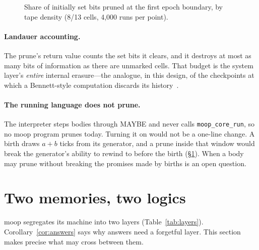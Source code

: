\documentclass[11pt]{article}
\theoremstyle{definition}
\theoremstyle{remark}
\newcommand{\moop}{\textsf{moop}}
\newcommand{\code}[1]{\texttt{#1}}
\begin{document}
\begin{figure}[t]
\centering
{}
\caption{Share of initially set bits pruned at the first epoch boundary,
by tape density (8/13 cells, 4,000 runs per point).}
\label{fig:density}
\end{figure}

\paragraph{Landauer accounting.}
The prune's return value counts the set bits it clears, and it destroys
at most as many bits of information as there are unmarked cells. That
budget is the system layer's \emph{entire} internal erasure---the
analogue, in this design, of the checkpoints at which a Bennett-style
computation discards its history~\cite{bennett1989}.

\paragraph{The running language does not prune.}
The interpreter steps bodies through MAYBE and never calls
\code{moop\_core\_run}, so no \moop{} program prunes today. Turning it on
would not be a one-line change. A birth draws $a+b$ ticks from its
generator, and a prune inside that window would break the generator's
ability to rewind to before the birth (\S\ref{sec:layers}). When a body
may prune without breaking the promises made by births is an open
question.

\section{Two memories, two logics}
\label{sec:layers}

\moop{} segregates its machine into two layers (Table~\ref{tab:layers}).
Corollary~\ref{cor:answers} says why answers need a forgetful layer. This section
makes precise what may cross between them.
\end{document}

